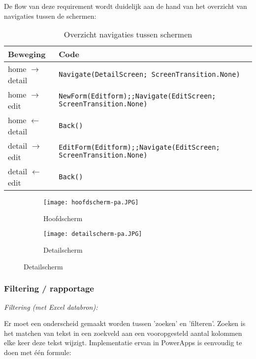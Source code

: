 De flow van deze requirement wordt duidelijk aan de hand van het overzicht van navigaties tussen de schermen:\\
\begin{table}[h!]
    \begin{tabular}{|l|l|}
        \hline
        \textbf{Beweging}         & \textbf{Code}                                                   \\ \hline
        home $\rightarrow$ detail & \lstinline|Navigate(DetailScreen; ScreenTransition.None)|                   \\ \hline
        home $\rightarrow$ edit   & \lstinline|NewForm(Editform);;Navigate(EditScreen; ScreenTransition.None)|  \\ \hline
        home $\leftarrow$ detail  & \lstinline|Back()|                                                          \\ \hline
        detail $\rightarrow$ edit & \lstinline|EditForm(Editform);;Navigate(EditScreen; ScreenTransition.None)| \\ \hline
        detail $\leftarrow$ edit  & \lstinline|Back()|                                                          \\ \hline
    \end{tabular}
    \caption{Overzicht navigaties tussen schermen}
    \label{tab:app-flow}
\end{table}

\begin{figure}[h!]
    \centering
    \begin{subfigure}[b]{\linewidth}
        \texttt{[image: hoofdscherm-pa.JPG]}
        \caption{Hoofdscherm}
    \end{subfigure}
    \begin{subfigure}[b]{\linewidth}
        \texttt{[image: detailscherm-pa.JPG]}
        \caption{Detailscherm}
    \end{subfigure}
    \label{fig:hoofd-detail-pa}
\end{figure}

\subsubsection{Filtering / rapportage}

\textit{Filtering (met Excel databron):}

Er moet een onderscheid gemaakt worden tussen 'zoeken' en 'filteren'. Zoeken is het matchen van tekst in een zoekveld aan een vooropgesteld aantal kolommen elke keer deze tekst wijzigt. Implementatie ervan in PowerApps is eenvoudig te doen met één formule:

